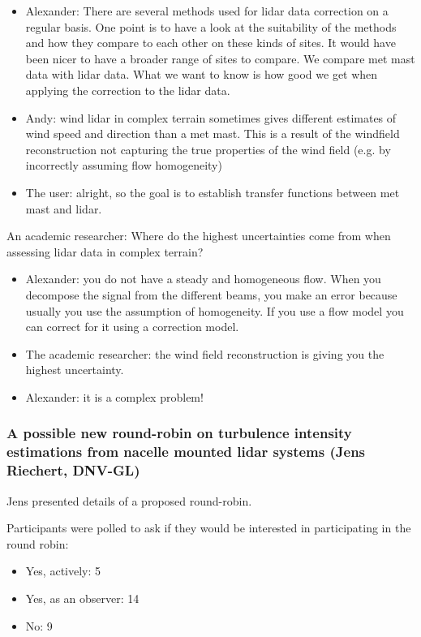 \begin{itemize}
\item Alexander: There are several methods used for lidar data correction on
  a regular basis. One point is to have a look at the suitability of the
  methods and how they compare to each other on these kinds of sites. It
  would have been nicer to have a broader range of sites to compare. We
  compare met mast data with lidar data. What we want to know is how
  good we get when applying the correction to the lidar data.
\item Andy: wind lidar in complex terrain sometimes gives different
  estimates of wind speed and direction than a met mast. This is a
  result of the windfield reconstruction not capturing the true
  properties of the wind field (e.g. by incorrectly assuming flow
  homogeneity)
\item The user: alright, so the goal is to establish transfer functions
  between met mast and lidar.
\end{itemize}

An academic researcher: Where do the highest uncertainties come from
when assessing lidar data in complex terrain?

\begin{itemize}
\item Alexander: you do not have a steady and homogeneous flow. When you
  decompose the signal from the different beams, you make an error
  because usually you use the assumption of homogeneity. If you use a
  flow model you can correct for it using a correction model.
\item The academic researcher: the wind field reconstruction is giving you
  the highest uncertainty.
\item Alexander: it is a complex problem!
\end{itemize}

\subsubsection[A possible round robin on turbulence estimates from nacelle-mounted lidar]{A possible new round-robin on turbulence intensity
estimations from nacelle mounted lidar systems (Jens Riechert, DNV-GL)}

Jens presented details of a proposed round-robin.

Participants were polled to ask if they would be interested in
participating in the round robin:

\begin{itemize}
\item Yes, actively: 5
\item Yes, as an observer: 14
\item No: 9
\end{itemize}

